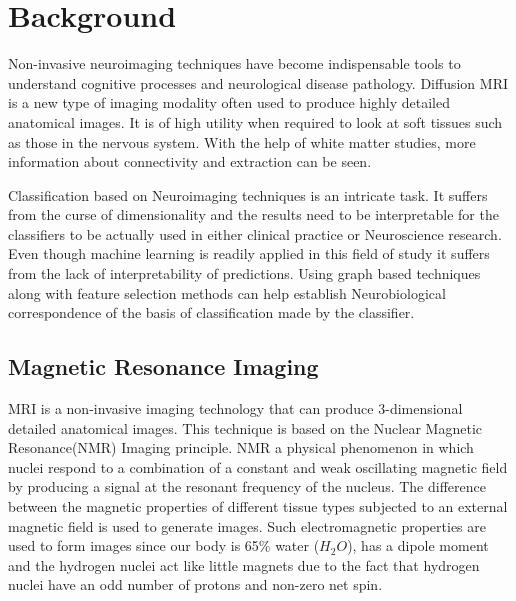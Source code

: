 \documentclass[msthesis.tex]{subfiles}
\begin{document}
\chapter{Background}
Non-invasive neuroimaging techniques have become indispensable tools to understand cognitive processes and neurological disease pathology. Diffusion MRI is a new type of imaging modality often used to produce highly detailed anatomical images. It is of high utility when required to look at soft tissues such as those in the nervous system. With the help of white matter studies, more information about connectivity and extraction can be seen.

Classification based on Neuroimaging techniques is an intricate task. It suffers from the curse of dimensionality and the results need to be interpretable for the classifiers to be actually used in either clinical practice or Neuroscience research. Even though machine learning is readily applied in this field of study it suffers from the lack of interpretability of predictions. Using graph based techniques along with feature selection methods can help establish Neurobiological correspondence of the basis of classification made by the classifier.  

\section{Magnetic Resonance Imaging}
MRI is a non-invasive imaging technology that can produce 3-dimensional detailed anatomical images\citep{mcrobbie_moore_graves_prince_2006}. This technique is based on the Nuclear Magnetic Resonance(NMR) Imaging principle. NMR a physical phenomenon in which nuclei respond to a combination of a constant and weak oscillating magnetic field by producing a signal at the resonant frequency of the nucleus. The difference between the magnetic properties of different tissue types subjected to an external magnetic field is used to generate images. Such electromagnetic properties are used to form images since our body is 65\% water ($H_2O$), has a dipole moment and the hydrogen nuclei act like little magnets due to the fact that hydrogen nuclei have an odd number of protons and non-zero net spin. 
\end{document}
